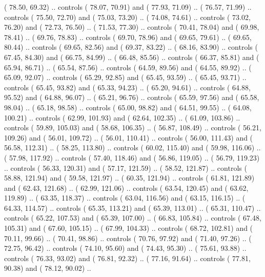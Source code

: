 {        (  78.50,  69.32) .. controls (  78.07,  70.91) and (  77.93,  71.09) ..
        (  76.57,  71.99) .. controls (  75.50,  72.70) and (  75.03,  73.20) ..
        (  74.08,  74.61) .. controls (  73.02,  76.20) and (  72.73,  76.50) ..
        (  71.53,  77.30) .. controls (  70.41,  78.04) and (  69.98,  78.41) ..
        (  69.76,  78.83) .. controls (  69.70,  78.96) and (  69.65,  79.61) ..
        (  69.65,  80.44) .. controls (  69.65,  82.56) and (  69.37,  83.22) ..
        (  68.16,  83.90) .. controls (  67.45,  84.30) and (  66.75,  84.99) ..
        (  66.48,  85.56) .. controls (  66.37,  85.81) and (  65.94,  86.71) ..
        (  65.54,  87.56) .. controls (  64.59,  89.56) and (  64.55,  89.92) ..
        (  65.09,  92.07) .. controls (  65.29,  92.85) and (  65.45,  93.59) ..
        (  65.45,  93.71) .. controls (  65.45,  93.82) and (  65.33,  94.23) ..
        (  65.20,  94.61) .. controls (  64.88,  95.52) and (  64.88,  96.07) ..
        (  65.21,  96.76) .. controls (  65.59,  97.56) and (  65.58,  98.04) ..
        (  65.18,  98.58) .. controls (  65.00,  98.82) and (  64.51,  99.55) ..
        (  64.08, 100.21) .. controls (  62.99, 101.93) and (  62.64, 102.35) ..
        (  61.09, 103.86) .. controls (  59.89, 105.03) and (  58.68, 106.35) ..
        (  56.87, 108.49) .. controls (  56.21, 109.26) and (  56.01, 109.72) ..
        (  56.01, 110.41) .. controls (  56.00, 111.43) and (  56.58, 112.31) ..
        (  58.25, 113.80) .. controls (  60.02, 115.40) and (  59.98, 116.06) ..
        (  57.98, 117.92) .. controls (  57.40, 118.46) and (  56.86, 119.05) ..
        (  56.79, 119.23) .. controls (  56.33, 120.31) and (  57.17, 121.59) ..
        (  58.52, 121.87) .. controls (  58.88, 121.94) and (  59.58, 121.97) ..
        (  60.35, 121.94) .. controls (  61.81, 121.89) and (  62.43, 121.68) ..
        (  62.99, 121.06) .. controls (  63.54, 120.45) and (  63.62, 119.89) ..
        (  63.35, 118.37) .. controls (  63.04, 116.56) and (  63.15, 116.15) ..
        (  64.33, 114.57) .. controls (  65.35, 113.21) and (  65.39, 113.01) ..
        (  65.31, 110.47) .. controls (  65.22, 107.53) and (  65.39, 107.00) ..
        (  66.83, 105.84) .. controls (  67.48, 105.31) and (  67.60, 105.15) ..
        (  67.99, 104.33) .. controls (  68.72, 102.81) and (  70.11,  99.66) ..
        (  70.41,  98.86) .. controls (  70.76,  97.92) and (  71.40,  97.26) ..
        (  72.75,  96.42) .. controls (  74.10,  95.60) and (  74.43,  95.30) ..
        (  75.61,  93.88) .. controls (  76.33,  93.02) and (  76.81,  92.32) ..
        (  77.16,  91.64) .. controls (  77.81,  90.38) and (  78.12,  90.02) ..
}
